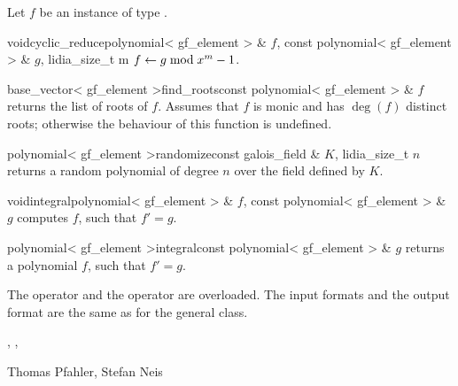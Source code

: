 
\HIGH

Let $f$ be an instance of type .

\begin{fcode}{void}{cyclic_reduce}{polynomial< gf_element > & $f$,
    const polynomial< gf_element > & $g$, lidia_size_t m}%
  $f \leftarrow g \bmod x^m-1$.
\end{fcode}

\begin{fcode}{base_vector< gf_element >}{find_roots}{const polynomial< gf_element > & $f$}
  returns the list of roots of $f$.  Assumes that $f$ is monic and has $\deg(f)$ distinct roots;
  otherwise the behaviour of this function is undefined.
\end{fcode}


\begin{fcode}{polynomial< gf_element >}{randomize}{const galois_field & $K$, lidia_size_t $n$}
  returns a random polynomial of degree $n$ over the field defined by $K$.
\end{fcode}



\begin{fcode}{void}{integral}{polynomial< gf_element > & $f$, const polynomial< gf_element > & $g$}
  computes $f$, such that $f' = g$.
\end{fcode}

\begin{fcode}{polynomial< gf_element >}{integral}{const polynomial< gf_element > & $g$}
  returns a polynomial $f$, such that $f' = g$.
\end{fcode}



\IO

The  operator \code{>>} and the  operator \code{<<} are overloaded.
The input formats and the output format are the same as for the general class.



\SEEALSO

,
,



%



\AUTHOR

Thomas Pfahler, Stefan Neis
